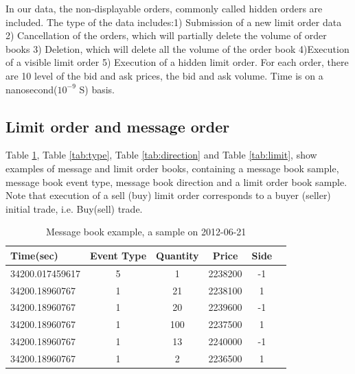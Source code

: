 In our data,  the non-displayable orders,   commonly called hidden orders are included. The type of the data includes:1) Submission of a new limit order data 2) Cancellation of the orders,   which will partially delete the volume of order books 3) Deletion,   which will delete all the volume of the order book 4)Execution of a visible limit order 5) Execution of a hidden limit order.  For each order,   there are 10 level of the bid and ask prices,   the bid and ask volume. Time is on a nanosecond($10^{-9}$ S) basis.
\subsection{Limit order and message order}
Table \ref{tab:message},   Table \ref{tab:type},  Table \ref{tab:direction} and Table \ref{tab:limit},   show examples of message and limit order books,  containing a message book sample,  message book event type,   message book direction and a limit order book sample. Note that execution of a sell (buy) limit order corresponds to a buyer (seller) initial trade,   i.e. Buy(sell) trade. 
\begin{table}
	\caption{Message book example,   a sample on 2012-06-21}
	\label{tab:message}
	\begin{center} 
		\begin{tabular}{|l|c|c|c|c|c|}
			\hline
			Time(sec) & Event Type & Quantity & Price & Side\\[5pt]
			 \hline
		34200.017459617& 5 &  1& 2238200& -1\\[5pt]
		34200.18960767& 1& 21& 2238100& 1 \\[5pt]
		34200.18960767&	1&	20& 2239600 & -1\\[5pt]
		34200.18960767& 1& 100& 2237500& 1 \\[5pt]
		34200.18960767& 1& 13& 2240000& -1 \\[5pt]
		34200.18960767& 1& 2& 2236500 & 1 \\[5pt]
			\hline 
		\end{tabular}
	\end{center}
\end{table}
 

